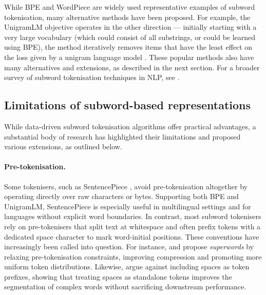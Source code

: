 While BPE and WordPiece are widely used representative examples of subword tokenisation, many alternative methods have been proposed. For example, the UnigramLM objective operates in the other direction --- initially starting with a very large vocabulary (which could consist of all substrings, or could be learned using BPE), the method iteratively removes items that have the least effect on the loss given by a unigram language model \citep{kudo-2018-unigram}. These popular methods also have many alternatives and extensions, as described in the next section.
For a broader survey of subword tokenisation techniques in NLP, see \citet{mielke2021between}.

\subsection{Limitations of subword-based representations}

While data-driven subword tokenisation algorithms offer practical advantages, a substantial body of research has highlighted their limitations and proposed various extensions, as outlined below.

\paragraph{Pre-tokenisation.} Some tokenisers, such as SentencePiece \citep{kudo-richardson-2018-sentencepiece}, avoid pre-tokenisation altogether by operating directly over raw characters or bytes. Supporting both BPE and UnigramLM, SentencePiece is especially useful in multilingual settings and for languages without explicit word boundaries. In contrast, most subword tokenisers rely on pre-tokenisers that split text at whitespace and often prefix tokens with a dedicated space character to mark word-initial positions. These conventions have increasingly been called into question. For instance, \citet{schmidt2025boundless} and \citet{liu2025superbpespacetravellanguage} propose \emph{superwords} by relaxing pre-tokenisation constraints, improving compression and promoting more uniform token distributions. Likewise, \citet{gow-smith-etal-2022-improving} argue against including spaces as token prefixes, showing that treating spaces as standalone tokens improves the segmentation of complex words without sacrificing downstream performance.

